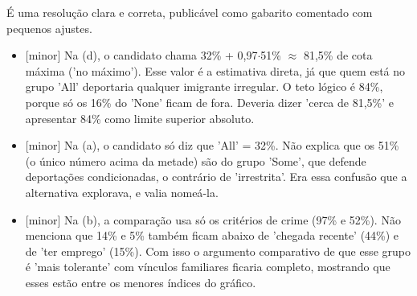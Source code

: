 \documentclass{article}%
\begin{document}
\newline%
É uma resolução clara e correta, publicável como gabarito comentado com pequenos ajustes.%
\begin{itemize}%
\item%
{[}minor{]} Na (d), o candidato chama 32\% + 0,97$\cdot$51\% $\approx$ 81,5\% de cota máxima ('no máximo'). Esse valor é a estimativa direta, já que quem está no grupo 'All' deportaria qualquer imigrante irregular. O teto lógico é 84\%, porque só os 16\% do 'None' ficam de fora. Deveria dizer 'cerca de 81,5\%' e apresentar 84\% como limite superior absoluto.%
\item%
{[}minor{]} Na (a), o candidato só diz que 'All' = 32\%. Não explica que os 51\% (o único número acima da metade) são do grupo 'Some', que defende deportações condicionadas, o contrário de 'irrestrita'. Era essa confusão que a alternativa explorava, e valia nomeá{-}la.%
\item%
{[}minor{]} Na (b), a comparação usa só os critérios de crime (97\% e 52\%). Não menciona que 14\% e 5\% também ficam abaixo de 'chegada recente' (44\%) e de 'ter emprego' (15\%). Com isso o argumento comparativo de que esse grupo é 'mais tolerante' com vínculos familiares ficaria completo, mostrando que esses estão entre os menores índices do gráfico.%
\end{itemize}%
\end{document}

